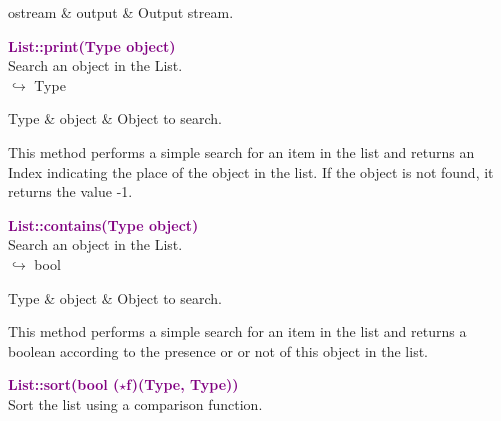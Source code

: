 \begin{tcolorbox}[width=\textwidth,myArgs,tabularx={ll|R}]
ostream & output & Output stream.
\end{tcolorbox}


\textcolor{purple}{\textbf{List::print(Type object)}}\label{List::print(Type object)}\\
Search an object in the List.\\ \hspace*{10mm}$\hookrightarrow$ Type

\begin{tcolorbox}[width=\textwidth,myArgs,tabularx={ll|R}]
Type & object & Object to search.
\end{tcolorbox}

This method performs a simple search for an item in the list and returns an Index indicating the place of the object in the list.
If the object is not found, it returns the value -1.

\textcolor{purple}{\textbf{List::contains(Type object)}}\label{List::contains(Type object)}\\
Search an object in the List.\\ \hspace*{10mm}$\hookrightarrow$ bool

\begin{tcolorbox}[width=\textwidth,myArgs,tabularx={ll|R}]
Type & object & Object to search.
\end{tcolorbox}

This method performs a simple search for an item in the list and returns a boolean according to the presence or or not of this object in the list.

\textcolor{purple}{\textbf{List::sort(bool ($\star$f)(Type, Type))}}\label{List::sort(bool (*f)(Type, Type))}\\
Sort the list using a comparison function.

